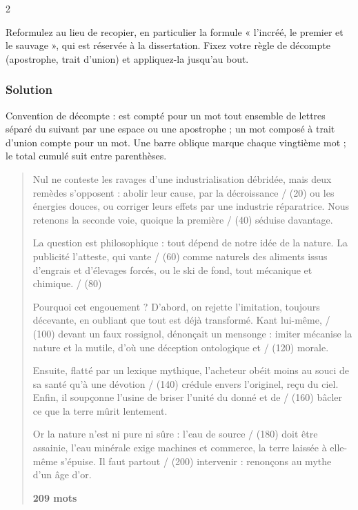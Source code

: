 \documentclass[11pt,a4paper]{article}
\begin{document}
\begin{indication}{2}

Reformulez au lieu de recopier, en particulier la formule « l'incréé, le premier et le sauvage », qui est réservée à la dissertation. Fixez votre règle de décompte (apostrophe, trait d'union) et appliquez-la jusqu'au bout.

\end{indication}

\hypertarget{solution-2}{%
\subsubsection{Solution}\label{solution-2}}

Convention de décompte : est compté pour un mot tout ensemble de lettres séparé du suivant par une espace ou une apostrophe ; un mot composé à trait d'union compte pour un mot. Une barre oblique marque chaque vingtième mot ; le total cumulé suit entre parenthèses.

\begin{quote}

Nul ne conteste les ravages d'une industrialisation débridée, mais deux remèdes s'opposent : abolir leur cause, par la décroissance / (20) ou les énergies douces, ou corriger leurs effets par une industrie réparatrice. Nous retenons la seconde voie, quoique la première / (40) séduise davantage.

La question est philosophique : tout dépend de notre idée de la nature. La publicité l'atteste, qui vante / (60) comme naturels des aliments issus d'engrais et d'élevages forcés, ou le ski de fond, tout mécanique et chimique. / (80)

Pourquoi cet engouement ? D'abord, on rejette l'imitation, toujours décevante, en oubliant que tout est déjà transformé. Kant lui-même, / (100) devant un faux rossignol, dénonçait un mensonge : imiter mécanise la nature et la mutile, d'où une déception ontologique et / (120) morale.

Ensuite, flatté par un lexique mythique, l'acheteur obéit moins au souci de sa santé qu'à une dévotion / (140) crédule envers l'originel, reçu du ciel. Enfin, il soupçonne l'usine de briser l'unité du donné et de / (160) bâcler ce que la terre mûrit lentement.

Or la nature n'est ni pure ni sûre : l'eau de source / (180) doit être assainie, l'eau minérale exige machines et commerce, la terre laissée à elle-même s'épuise. Il faut partout / (200) intervenir : renonçons au mythe d'un âge d'or.

\textbf{209 mots}

\end{quote}
\end{document}

